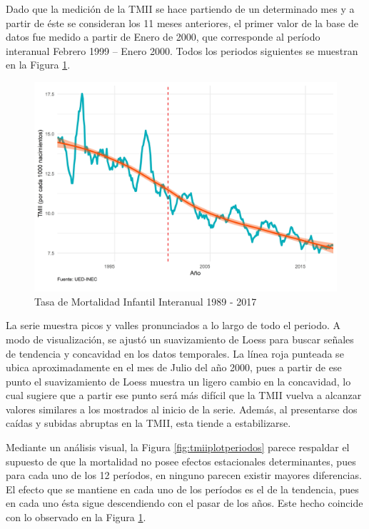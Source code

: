 \documentclass[
]{article}
\begin{document}
Dado que la medición de la TMII se hace partiendo de un determinado mes
y a partir de éste se consideran los 11 meses anteriores, el primer
valor de la base de datos fue medido a partir de Enero de 2000, que
corresponde al período interanual Febrero 1999 -- Enero 2000. Todos los
periodos siguientes se muestran en la Figura \ref{fig:tmiiplotgeneral}.

\begin{figure}[H]
\includegraphics[width=1\linewidth,height=1\textheight]{Tesis_files/figure-latex/tmiiplotgeneral-1} \caption{Tasa de Mortalidad Infantil Interanual 1989 - 2017}\label{fig:tmiiplotgeneral}
\end{figure}

La serie muestra picos y valles pronunciados a lo largo de todo el
periodo. A modo de visualización, se ajustó un suavizamiento de Loess
para buscar señales de tendencia y concavidad en los datos temporales.
La línea roja punteada se ubica aproximadamente en el mes de Julio del
año 2000, pues a partir de ese punto el suavizamiento de Loess muestra
un ligero cambio en la concavidad, lo cual sugiere que a partir ese
punto será más difícil que la TMII vuelva a alcanzar valores similares a
los mostrados al inicio de la serie. Además, al presentarse dos caídas y
subidas abruptas en la TMII, esta tiende a estabilizarse.

Mediante un análisis visual, la Figura \ref{fig:tmiiplotperiodos} parece
respaldar el supuesto de que la mortalidad no posee efectos estacionales
determinantes, pues para cada uno de los 12 períodos, en ninguno parecen
existir mayores diferencias. El efecto que se mantiene en cada uno de
los períodos es el de la tendencia, pues en cada uno ésta sigue
descendiendo con el pasar de los años. Este hecho coincide con lo
observado en la Figura \ref{fig:tmiiplotgeneral}.
\end{document}
